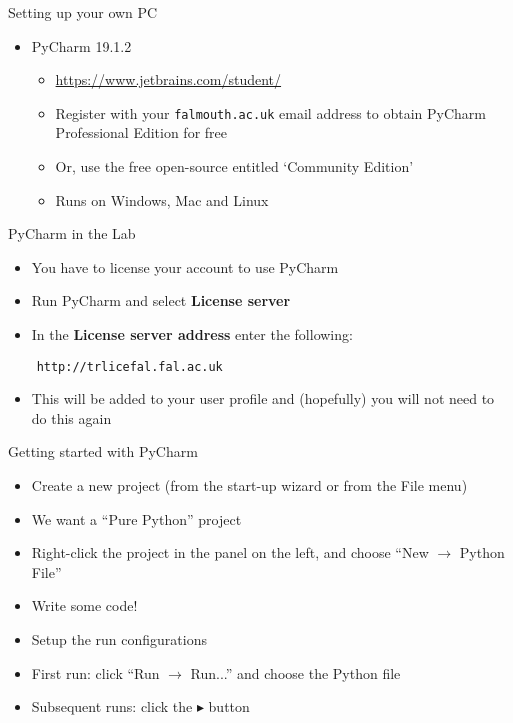 \begin{frame}{Setting up your own PC}
\begin{itemize}
\item PyCharm 19.1.2
\begin{itemize}
	\item \url{https://www.jetbrains.com/student/}
	\item Register with your \texttt{falmouth.ac.uk} email address to obtain PyCharm Professional Edition for free
	\item Or, use the free open-source entitled `Community Edition'
	\item Runs on Windows, Mac and Linux
\end{itemize}
\end{itemize}
\end{frame}

\begin{frame}[fragile]{PyCharm in the Lab}
	\begin{itemize}
		\item You have to license your account to use PyCharm
		\item Run PyCharm and select \textbf{License server}
		\item In the \textbf{License server address} enter the following:
	\end{itemize} 
	 \begin{lstlisting}
	http://trlicefal.fal.ac.uk
 	\end{lstlisting}
	\begin{itemize}
		\item This will be added to your user profile and (hopefully) you will not need to do this again
	\end{itemize} 
\end{frame}

\begin{frame}{Getting started with PyCharm}
\begin{itemize}
\item Create a new project (from the start-up wizard or from the File menu)
\item We want a ``Pure Python'' project
\item Right-click the project in the panel on the left, and choose ``New $\to$ Python File''
\item Write some code!
\item Setup the run configurations
\item First run: click ``Run $\to$ Run...'' and choose the Python file
\item Subsequent runs: click the $\blacktriangleright$ button
\end{itemize}
\end{frame}
